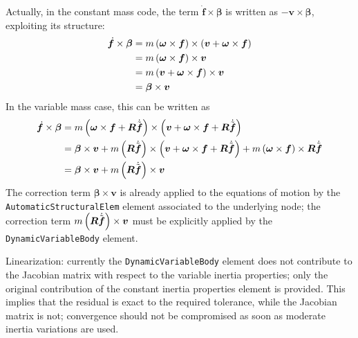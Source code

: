 \documentclass[10pt,dvips,fleqn,subeqn]{report}
\newcommand{\T}[1]{\bm{#1}}
\newcommand{\TT}[1]{\bm{#1}}
\begin{document}
Actually, in the constant mass code, the term $\dot{\T{f}} \times \T{\beta}$
is written as $-\T{v}\times\T{\beta}$, exploiting its structure:
\begin{align}
	\dot{\T{f}} \times \T{\beta}
	&=
	m \plbr{\T{\omega} \times \T{f}} \times \plbr{\T{v} + \T{\omega} \times \T{f}}
	\nonumber \\
	&=
	m \plbr{\T{\omega} \times \T{f}} \times \T{v}
	\nonumber \\
	&=
	m \plbr{\T{v} + \T{\omega} \times \T{f}} \times \T{v}
	\nonumber \\
	&=
	\T{\beta} \times \T{v}
\end{align}
In the variable mass case, this can be written as
\begin{align}
	\dot{\T{f}} \times \T{\beta}
	&=
	m \plbr{\T{\omega} \times \T{f} + \TT{R} \dot{\tilde{\T{f}}}} \times
		\plbr{\T{v} + \T{\omega} \times \T{f} + \TT{R} \dot{\tilde{\T{f}}}}
	\nonumber \\
	&=
	\T{\beta} \times \T{v}
	+
	m \plbr{\TT{R} \dot{\tilde{\T{f}}}} \times 
		\plbr{\T{v} + \T{\omega} \times \T{f} + \TT{R} \dot{\tilde{\T{f}}}}
	+
	m \plbr{\T{\omega} \times \T{f}} \times \TT{R} \dot{\tilde{\T{f}}}
	\nonumber \\
	&=
	\T{\beta} \times \T{v}
	+
	m \plbr{\TT{R} \dot{\tilde{\T{f}}}} \times \T{v}
\end{align}
The correction term $\T{\beta} \times \T{v}$ is already applied
to the equations of motion by the \texttt{AutomaticStructuralElem}
element associated to the underlying node;
the correction term $m \plbr{\TT{R} \dot{\tilde{\T{f}}}} \times \T{v}$
must be explicitly applied by the \texttt{DynamicVariableBody} element.

\bigskip
Linearization:
currently the \texttt{DynamicVariableBody} element does not contribute
to the Jacobian matrix with respect to the variable inertia properties;
only the original contribution of the constant inertia properties element
is provided.
This implies that the residual is exact to the required tolerance,
while the Jacobian matrix is not; convergence should not be compromised
as soon as moderate inertia variations are used.
\end{document}

